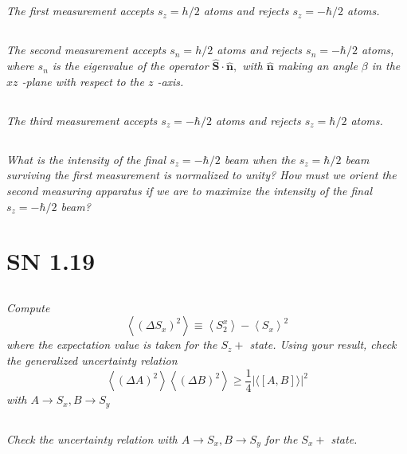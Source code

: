 \documentclass{article}
\begin{document}
\subsection{}
\textit{The first measurement accepts $s_{z}=h / 2$ atoms and rejects $s_{z}=-\hbar / 2$ atoms. }


\subsection{}
\textit{The second measurement accepts $s_{n}=h / 2$ atoms and rejects $s_{n}=-\hbar / 2$ atoms, where $s_{n}$ is the eigenvalue of the operator $\hat{\mathbf{S}} \cdot \hat{\mathbf{n}},$ with $\hat{\mathbf{n}}$ making an angle $\beta$ in the $x z$ -plane with respect to the $z$ -axis.}


\subsection{}
\textit{The third measurement accepts $s_{z}=-\hbar / 2$ atoms and rejects $s_{z}=\hbar / 2$ atoms.}

\subsection*{}
\textit{What is the intensity of the final $s_{z}=-\hbar / 2$ beam when the $s_{z}=\hbar / 2$ beam surviving the first measurement is normalized to unity? How must we orient the second measuring apparatus if we are to maximize the intensity of the final $s_{z}=-\hbar / 2$ beam?}


\newpage

\section{SN 1.19}


\subsection{}
\textit{Compute
$$
\left\langle\left(\Delta S_{x}\right)^{2}\right\rangle \equiv\left\langle S_{2}^{x}\right\rangle-\left\langle S_{x}\right\rangle^{2}
$$
where the expectation value is taken for the $S_{z}+$ state. Using your result, check the generalized uncertainty relation
$$
\left\langle(\Delta A)^{2}\right\rangle\left\langle(\Delta B)^{2}\right\rangle \geq \frac{1}{4}|\langle[A, B]\rangle|^{2}
$$
with $A \rightarrow S_{x}, B \rightarrow S_{y}$}


\subsection{}
\textit{Check the uncertainty relation with $A \rightarrow S_{x}, B \rightarrow S_{y}$ for the $S_{x}+$ state.}
\end{document}
